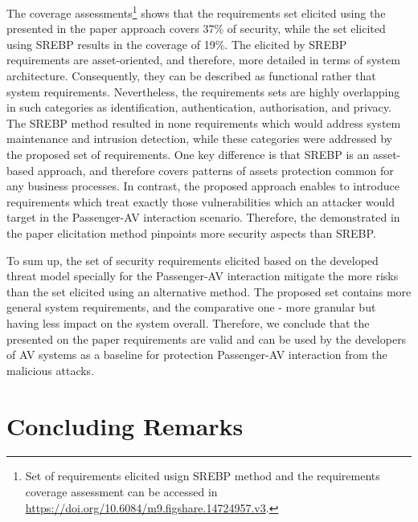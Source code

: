 \documentclass[manuscript]{acmart}
\begin{document}
The coverage assessments\footnote{Set of requirements elicited usign SREBP method and the requirements coverage assessment can be accessed in \textcolor{blue}{\url{https://doi.org/10.6084/m9.figshare.14724957.v3}}.} shows that the requirements set elicited using the presented in the paper approach covers 37\% of security, while the set elicited using SREBP results in the coverage of 19\%. The elicited by SREBP requirements are asset-oriented, and therefore, more detailed in terms of system architecture. Consequently, they can be described as functional rather that system requirements. Nevertheless, the requirements sets are highly overlapping in such categories as identification, authentication, authorisation, and privacy. The SREBP method resulted in none requirements which would address system maintenance and intrusion detection, while these categories were addressed by the proposed set of requirements. One key difference is that SREBP is an asset-based approach, and therefore covers patterns of assets protection common for any business processes. In contrast, the proposed approach enables to introduce requirements which treat exactly those vulnerabilities which an attacker would target in the Passenger-AV interaction scenario. Therefore, the demonstrated in the paper elicitation method pinpoints more security aspects than SREBP.

To sum up, the set of security requirements elicited based on the developed threat model specially for the Passenger-AV interaction mitigate the more risks than the set elicited using an alternative method. The proposed set contains more general system requirements, and the comparative one - more granular but having less impact on the system overall. Therefore, we conclude that the presented on the paper requirements are valid and can be used by the developers of AV systems as a baseline for protection Passenger-AV interaction from the malicious attacks.

\section{Concluding Remarks} \label{sec:Discussion} 

\end{document}
